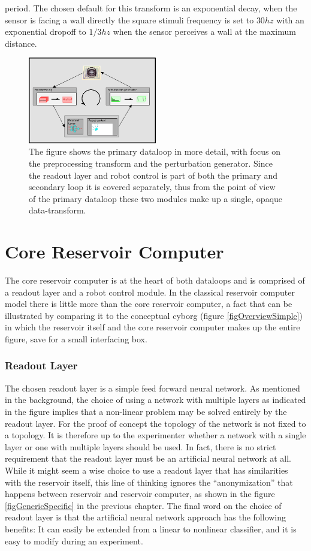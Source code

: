 period.
The chosen default for this transform is an exponential decay, when the sensor
is facing a wall directly the square stimuli frequency is set to $30hz$ with an
exponential dropoff to $1/3hz$ when the sensor perceives a wall at the maximum
distance.
\begin{figure}[h!]
  \centering
  \includegraphics[width=0.5\textwidth]{fig/rcLoop.png}
  \caption{
    The figure shows the primary dataloop in more detail, with focus on the
    preprocessing transform and the perturbation generator.
    Since the readout layer and robot control is part of both the primary and
    secondary loop it is covered separately, thus from the point of view of the
    primary dataloop these two modules make up a single, opaque data-transform.
  }
  \label{figDataLoop}
\end{figure}
%
\section{Core Reservoir Computer}
The core reservoir computer is at the heart of both dataloops and is
comprised of a readout layer and a robot control module.
In the classical reservoir computer model there is little more than the core
reservoir computer, a fact that can be illustrated by comparing it to the
conceptual cyborg (figure \ref{figOverviewSimple}) in which the reservoir itself and the
core reservoir computer makes up the entire figure, save for a small interfacing box.
\subsubsection{Readout Layer}
The chosen readout layer is a simple feed forward neural network.
As mentioned in the background, the choice of using a network with multiple
layers as indicated in the figure implies that a non-linear problem may be solved
entirely by the readout layer.
For the proof of concept the topology of the network is not fixed to a topology.
It is therefore up to the experimenter whether a network with a single layer or one
with multiple layers should be used.
In fact, there is no strict requirement that the readout layer must be an
artificial neural network at all.
While it might seem a wise choice to use a readout layer that has similarities
with the reservoir itself, this line of thinking ignores the ``anonymization''
that happens between reservoir and reservoir computer, as shown in the figure
\ref{figGenericSpecific} in the previous chapter.
The final word on the choice of readout layer is that the artificial neural
network approach has the following benefits:
It can easily be extended from a linear to nonlinear classifier, and it is easy
to modify during an experiment.
